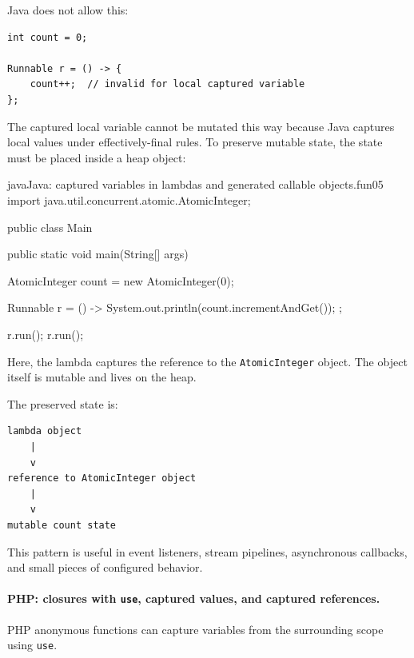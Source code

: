 \documentclass[a4paper,twoside]{report}
\begin{document}
Java does not allow this:

\begin{verbatim}
int count = 0;

Runnable r = () -> {
    count++;  // invalid for local captured variable
};
\end{verbatim}

The captured local variable cannot be mutated this way because Java captures local values under effectively-final rules. To preserve mutable state, the state must be placed inside a heap object:

\begin{codebox}[]{java}{Java: captured variables in lambdas and generated callable objects.}{fun05}
import java.util.concurrent.atomic.AtomicInteger;

public class Main {
    public static void main(String[] args) {
        AtomicInteger count = new AtomicInteger(0);

        Runnable r = () -> {
            System.out.println(count.incrementAndGet());
        };

        r.run();
        r.run();
    }
}
\end{codebox}


Here, the lambda captures the reference to the \texttt{AtomicInteger} object. The object itself is mutable and lives on the heap.

The preserved state is:

\begin{verbatim}
lambda object
    |
    v
reference to AtomicInteger object
    |
    v
mutable count state
\end{verbatim}

This pattern is useful in event listeners, stream pipelines, asynchronous callbacks, and small pieces of configured behavior.

\paragraph{PHP: closures with \texttt{use}, captured values, and captured references.}

PHP anonymous functions can capture variables from the surrounding scope using \texttt{use}.

\end{document}
